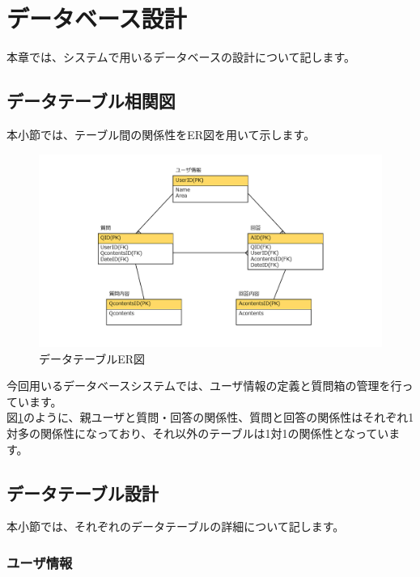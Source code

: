 \documentclass[a4j]{jarticle}
\begin{document}
\newpage

\section{データベース設計}
本章では、システムで用いるデータベースの設計について記します。
\subsection{データテーブル相関図}
本小節では、テーブル間の関係性をER図を用いて示します。
\begin{figure}[H]
  \begin{center} %
    \includegraphics[width=16.0cm]{ER図v2.png}
    \caption{データテーブルER図} %
    \label{fig:er} %
  \end{center}
\end{figure}

今回用いるデータベースシステムでは、ユーザ情報の定義と質問箱の管理を行っています。\\
図\ref{fig:er}のように、親ユーザと質問・回答の関係性、質問と回答の関係性はそれぞれ1対多の関係性になっており、それ以外のテーブルは1対1の関係性となっています。

\subsection{データテーブル設計}
本小節では、それぞれのデータテーブルの詳細について記します。

\subsubsection{ユーザ情報}
\end{document}
